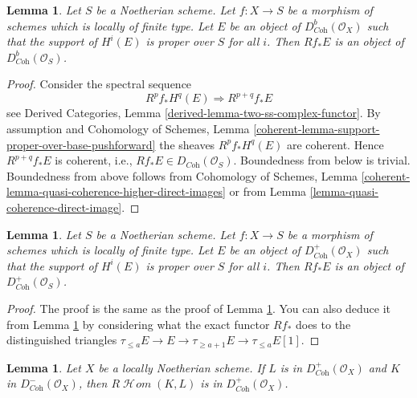 \documentclass{stacks-project}
\theoremstyle{plain}
\newtheorem{lemma}[subsection]{Lemma}
\theoremstyle{definition}
\theoremstyle{remark}
\numberwithin{equation}{subsection}
\def\SheafHom{\mathop{\mathcal{H}\!\mathit{om}}\nolimits}
\begin{document}
\begin{lemma}
\label{lemma-direct-image-coherent}
Let $S$ be a Noetherian scheme. Let $f : X \to S$ be a morphism of schemes
which is locally of finite type. Let $E$ be an object of
$D^b_{\textit{Coh}}(\mathcal{O}_X)$ such that the support of $H^i(E)$
is proper over $S$ for all $i$.
Then $Rf_*E$ is an object of $D^b_{\textit{Coh}}(\mathcal{O}_S)$.
\end{lemma}

\begin{proof}
Consider the spectral sequence
$$
R^pf_*H^q(E) \Rightarrow R^{p + q}f_*E
$$
see Derived Categories, Lemma \ref{derived-lemma-two-ss-complex-functor}.
By assumption and
Cohomology of Schemes, Lemma
\ref{coherent-lemma-support-proper-over-base-pushforward}
the sheaves $R^pf_*H^q(E)$ are coherent. Hence
$R^{p + q}f_*E$ is coherent, i.e., $Rf_*E \in D_{\textit{Coh}}(\mathcal{O}_S)$.
Boundedness from below is trivial. Boundedness from above
follows from
Cohomology of Schemes, Lemma
\ref{coherent-lemma-quasi-coherence-higher-direct-images}
or from
Lemma \ref{lemma-quasi-coherence-direct-image}.
\end{proof}

\begin{lemma}
\label{lemma-direct-image-coherent-bdd-below}
Let $S$ be a Noetherian scheme. Let $f : X \to S$ be a morphism of schemes
which is locally of finite type. Let $E$ be an object of
$D^+_{\textit{Coh}}(\mathcal{O}_X)$ such that the support of $H^i(E)$
is proper over $S$ for all $i$.
Then $Rf_*E$ is an object of $D^+_{\textit{Coh}}(\mathcal{O}_S)$.
\end{lemma}

\begin{proof}
The proof is the same as the proof of
Lemma \ref{lemma-direct-image-coherent}.
You can also deduce it from
Lemma \ref{lemma-direct-image-coherent}
by considering what the exact functor $Rf_*$ does to
the distinguished triangles
$\tau_{\leq a}E \to E \to \tau_{\geq a + 1}E \to \tau_{\leq a}E[1]$.
\end{proof}

\begin{lemma}
\label{lemma-coherent-internal-hom}
Let $X$ be a locally Noetherian scheme. If $L$ is in
$D^+_{\textit{Coh}}(\mathcal{O}_X)$ and $K$ in
$D^-_{\textit{Coh}}(\mathcal{O}_X)$, then
$R\SheafHom(K, L)$ is in $D^+_{\textit{Coh}}(\mathcal{O}_X)$.
\end{lemma}
\end{document}
